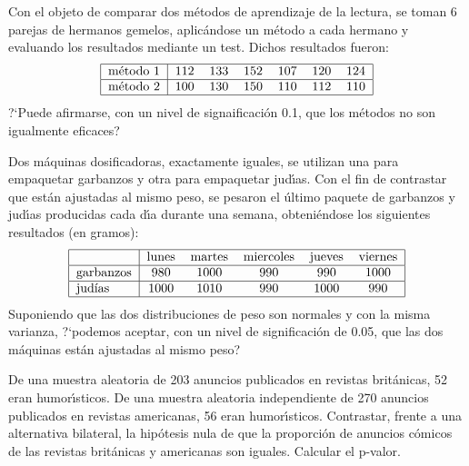 \begin{prob}%
    Con el objeto de comparar dos m\'etodos de aprendizaje de la
    lectura, se toman 6 parejas de hermanos gemelos, aplic\'andose un
    m\'etodo a cada hermano y evaluando los resultados mediante un test.
    Dichos resultados fueron:
    $$
    \begin{tabular}{|l|cccccc|}
    \hline
    m\'etodo 1 & 112 & 133 & 152 & 107 & 120 & 124   \\
    \hline
    m\'etodo 2 & 100 & 130 & 150 & 110 & 112 & 110   \\
    \hline
    \end{tabular}
    $$
    ?`Puede afirmarse, con un nivel de signaificaci\'on 0.1, que los
    m\'etodos no son igualmente eficaces?
\end{prob}

\begin{prob}%
    Dos m\'aquinas dosificadoras, exactamente iguales, se utilizan una
    para empaquetar garbanzos y otra para empaquetar jud\'{\i}as.  Con
    el fin de contrastar que est\'an ajustadas al mismo peso, se
    pesaron el \'ultimo paquete de garbanzos y jud\'{\i}as producidas
    cada d\'{\i}a durante una semana, obteni\'endose los siguientes
    resultados (en gramos):
    $$
    \begin{tabular}{|l|ccccc|}
    \hline
                & lunes & martes & miercoles & jueves & viernes   \\
    \hline
    garbanzos   & 980   & 1000   & 990       & 990    & 1000      \\
    \hline
    jud\'{\i}as & 1000  & 1010   & 990       & 1000   & 990       \\
    \hline
    \end{tabular}
    $$
    Suponiendo que las dos distribuciones de peso son normales y con
    la misma varianza, ?`podemos aceptar, con un nivel de
    significaci\'on de 0.05, que las dos m\'aquinas est\'an
    ajustadas al mismo peso?
\end{prob}

\begin{prob}%
    De una muestra aleatoria de 203 anuncios publicados en revistas
    brit\'anicas, 52 eran humor\'{\i}sticos. De una muestra aleatoria
    independiente de 270 anuncios publicados en revistas americanas,
    56 eran humor\'{\i}sticos. Contrastar, frente a una alternativa
    bilateral, la hip\'otesis nula de que la proporci\'on de anuncios
    c\'omicos de las revistas brit\'anicas y americanas son iguales.
    Calcular el p-valor.
\end{prob}

